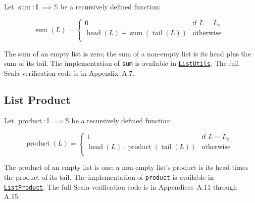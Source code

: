 Let $\operatorname{sum} : \mathbb{L} \implies \mathbb{S}$ be a recursively
defined function:

\begin{equation*}
\operatorname{sum}(L) =
\begin{cases} 0 & \text{if } L = L_e \\
\operatorname{head}(L) + \operatorname{sum}(\operatorname{tail}(L)) & \text{otherwise} \\
\end{cases}
\end{equation*}

The sum of an empty list is zero; the sum of a non-empty list is its head
plus the sum of its tail. The implementation of \texttt{sum} is available
in
\href{https://github.com/thiagomata/prime-numbers/blob/list-article-v1.0.0/src/main/scala/v1/chapter3/list/ListUtils.scala#sum}{\texttt{ListUtils}}.
The full Scala verification code is in Appendix~A.7.

\subsection{List Product}

Let $\operatorname{product} : \mathbb{L} \implies \mathbb{S}$ be a
recursively defined function:

\begin{equation*}
\operatorname{product}(L) =
\begin{cases} 1 & \text{if } L = L_e \\
\operatorname{head}(L) \cdot \operatorname{product}(\operatorname{tail}(L)) & \text{otherwise} \\
\end{cases}
\end{equation*}

The product of an empty list is one; a non-empty list's product is its
head times the product of its tail. The implementation of
\texttt{product} is available in
\href{https://github.com/thiagomata/prime-numbers/blob/list-article-v1.0.0/src/main/scala/v1/chapter3/list/properties/ListProduct.scala}{\texttt{ListProduct}}.
The full Scala verification code is in Appendices~A.11 through A.15.
